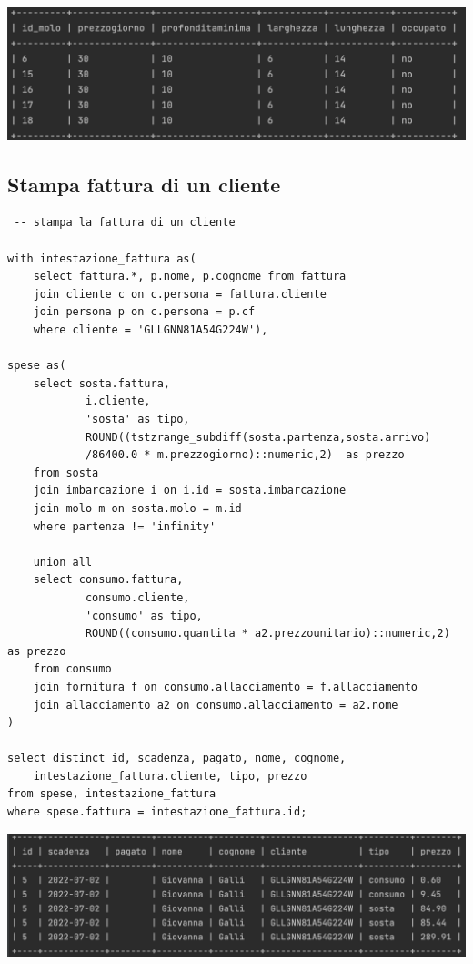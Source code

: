 \includegraphics[width=\linewidth]{img/result_molidisponibili.png}

\subsection{Stampa fattura di un cliente}

\begin{lstlisting}
 -- stampa la fattura di un cliente

with intestazione_fattura as(
    select fattura.*, p.nome, p.cognome from fattura
    join cliente c on c.persona = fattura.cliente
    join persona p on c.persona = p.cf
    where cliente = 'GLLGNN81A54G224W'),

spese as(
    select sosta.fattura,
            i.cliente,
            'sosta' as tipo,
            ROUND((tstzrange_subdiff(sosta.partenza,sosta.arrivo)
            /86400.0 * m.prezzogiorno)::numeric,2)  as prezzo
    from sosta
    join imbarcazione i on i.id = sosta.imbarcazione
    join molo m on sosta.molo = m.id
    where partenza != 'infinity'

    union all
    select consumo.fattura,
            consumo.cliente,
            'consumo' as tipo,
            ROUND((consumo.quantita * a2.prezzounitario)::numeric,2) as prezzo
    from consumo
    join fornitura f on consumo.allacciamento = f.allacciamento
    join allacciamento a2 on consumo.allacciamento = a2.nome
)

select distinct id, scadenza, pagato, nome, cognome,
    intestazione_fattura.cliente, tipo, prezzo
from spese, intestazione_fattura
where spese.fattura = intestazione_fattura.id;
\end{lstlisting}

\includegraphics[width = \linewidth]{img/result_fattura.png}


